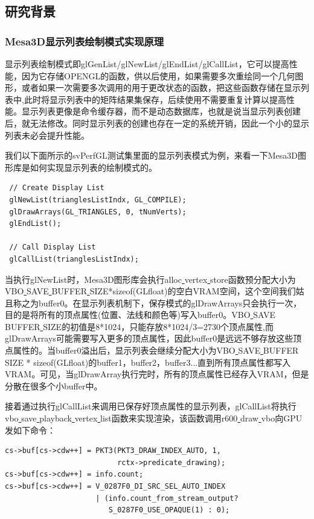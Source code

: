 
\subsection{研究背景}

\subsubsection{Mesa3D显示列表绘制模式实现原理}

显示列表绘制模式即glGenList/glNewList/glEndList/glCallList，它可以提高性能，因为它存储OPENGL的函数，供以后使用，如果需要多次重绘同一个几何图形，或者如果一次需要多次调用的用于更改状态的函数，把这些函数存储在显示列表中,此时将显示列表中的矩阵结果集保存，后续使用不需要重复计算以提高性能。显示列表更像是命令缓存器，而不是动态数据库，也就是说当显示列表创建后，就无法修改。同时显示列表的创建也存在一定的系统开销，因此一个小的显示列表未必会提升性能。

我们以下面所示的svPerfGL测试集里面的显示列表模式为例，来看一下Mesa3D图形库是如何实现显示列表的绘制模式的。

\begin{lstlisting}
 // Create Display List
 glNewList(trianglesListIndx, GL_COMPILE);
 glDrawArrays(GL_TRIANGLES, 0, tNumVerts);
 glEndList(); 

 // Call Display List
 glCallList(trianglesListIndx);
\end{lstlisting}


当执行glNewList时，Mesa3D图形库会执行alloc\underline{ }vertex\underline{ }store函数预分配大小为VBO\underline{ }SAVE\underline{ }BUFFER\underline{ }SIZE*sizeof(GLfloat)的空白VRAM空间，这个空间我们姑且称之为buffer0。在显示列表机制下，保存模式的glDrawArrays只会执行一次，目的是将所有的顶点属性(位置、法线和颜色等)写入buffer0。VBO\underline{ }SAVE\underline{ }BUFFER\underline{ }SIZE的初值是8*1024，只能存放8*1024/3=2730个顶点属性,而glDrawArrays可能需要写入更多的顶点属性，因此buffer0是远远不够存放这些顶点属性的。当buffer0溢出后，显示列表会继续分配大小为VBO\underline{ }SAVE\underline{ }BUFFER\underline{ }SIZE * sizeof(GLfloat)的buffer1，buffer2，buffer3...直到所有顶点属性都写入VRAM。可见，当glDrawArray执行完时，所有的顶点属性已经存入VRAM，但是分散在很多个小buffer中。

接着通过执行glCallList来调用已保存好顶点属性的显示列表，glCallList将执行vbo\underline{ }save\underline{ }playback\underline{ }vertex\underline{ }list函数来实现渲染，该函数调用r600\underline{ }draw\underline{ }vbo向GPU发如下命令：

\begin{lstlisting}
cs->buf[cs->cdw++] = PKT3(PKT3_DRAW_INDEX_AUTO, 1, 
                          rctx->predicate_drawing);
cs->buf[cs->cdw++] = info.count;
cs->buf[cs->cdw++] = V_0287F0_DI_SRC_SEL_AUTO_INDEX 
                     | (info.count_from_stream_output? 
                        S_0287F0_USE_OPAQUE(1) : 0);
\end{lstlisting}

